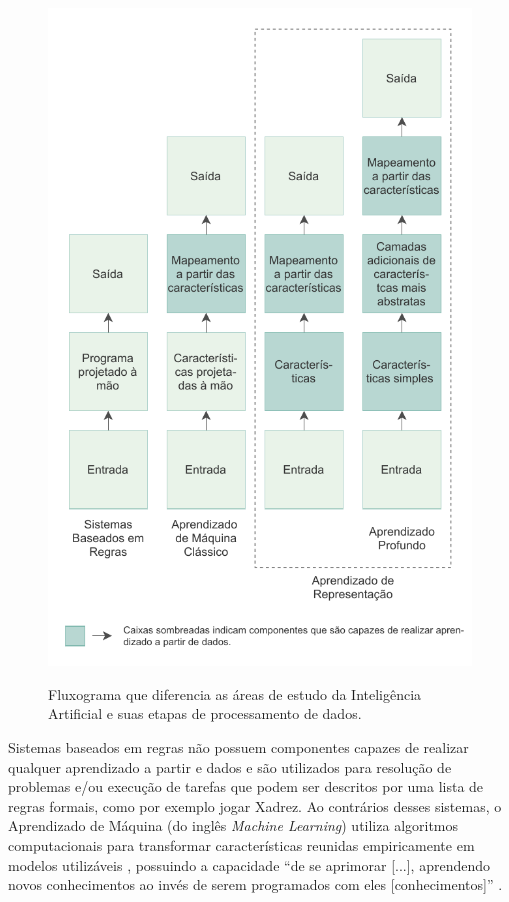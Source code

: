 \begin{figure}[h!] %
  \centering
  \caption{Fluxograma que diferencia as áreas de estudo da Inteligência Artificial e suas etapas de processamento de dados. }
  \includegraphics[scale=1.1]{img/img-fundamentacao-fluxograma.pdf}
  \label{fig:fund-fluxograma}
\end{figure}

Sistemas baseados em regras não possuem componentes capazes de realizar qualquer aprendizado a partir e dados \cite{ref:Goodfellow-Bengio-Courville} e são utilizados para resolução de problemas e/ou execução de tarefas que podem ser descritos por uma lista de regras formais, como por exemplo jogar Xadrez. Ao contrários desses sistemas, o Aprendizado de Máquina (do inglês \textit{Machine Learning}) utiliza algoritmos computacionais para transformar características reunidas empiricamente em modelos utilizáveis \cite{ref:Edgar-Manz}, possuindo a capacidade ``de se aprimorar [...], aprendendo novos conhecimentos ao invés de serem programados com eles [conhecimentos]'' \cite{ref:Woolf}. %


